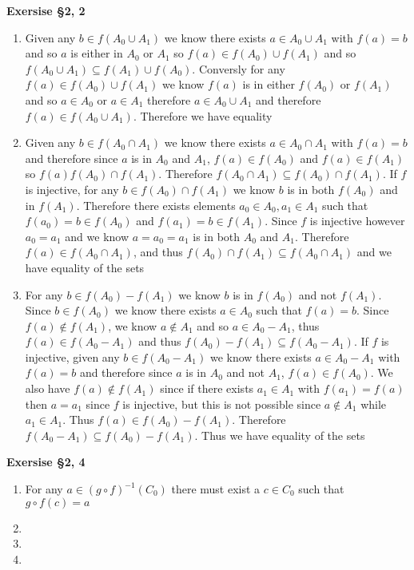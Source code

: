 \documentclass[12pt]{article}
\newenvironment{ques}[1]{\textbf{Exersise #1}\vspace{1 mm}\\ }{\bigskip}
\theoremstyle{definition}
\begin{document}
\begin{ques}{\S 2, 2}
\begin{enumerate}
		\item
			Given any $b \in f(A_0 \cup A_1)$ we know there exists
			$a \in A_0 \cup A_1$ with $f(a) = b$ and so $a$ is
			either in $A_0$ or $A_1$ so $f(a) \in f(A_0) \cup
			f(A_1)$ and so $f(A_0 \cup A_1) \subseteq f(A_1) \cup
			f(A_0)$.  Conversly for any $f(a) \in f(A_0) \cup
			f(A_1)$ we know $f(a)$ is in either $f(A_0)$ or
			$f(A_1)$ and so $a \in A_0$ or $a \in A_1$ therefore $a
			\in A_0 \cup A_1$ and therefore $f(a) \in f(A_0 \cup
			A_1)$. Therefore we have equality
		\item
			Given any $b \in f(A_0 \cap A_1)$ we know there exists
			$a \in A_0 \cap A_1$ with $f(a) = b$ and therefore
			since $a$ is in $A_0$ and $A_1$, $f(a) \in f(A_0)$ and
			$f(a) \in f(A_1)$ so $f(a) f(A_0) \cap f(A_1)$.
			Therefore $f(A_0 \cap A_1) \subseteq f(A_0) \cap
			f(A_1)$. If $f$ is injective, for any $b \in f(A_0)
			\cap f(A_1)$ we know $b$ is in both $f(A_0)$ and in
			$f(A_1)$. Therefore there exists elements $a_0 \in A_0,
			a_1 \in A_1$ such that $f(a_0) = b \in f(A_0)$ and
			$f(a_1) = b \in f(A_1)$. Since $f$ is injective however
			$a_0 = a_1$ and we know $a = a_0 = a_1$ is in both
			$A_0$ and $A_1$. Therefore $f(a) \in f(A_0 \cap A_1)$,
			and thus $f(A_0) \cap f(A_1) \subseteq f(A_0 \cap A_1)$
			and we have equality of the sets

		\item
			 For any $b \in f(A_0) - f(A_1)$ we know $b$ is in
			 $f(A_0)$ and not $f(A_1)$. Since $b \in f(A_0)$ we
			 know there exists $a \in A_0$ such that $f(a) = b$.
			 Since $f(a) \notin f(A_1)$, we know $a \notin A_1$ and
			 so $a \in A_0 - A_1$, thus $f(a) \in f(A_0 - A_1)$ and
			 thus $f(A_0) - f(A_1) \subseteq f(A_0 - A_1)$. If $f$
			 is injective, given any $b \in f(A_0 - A_1)$ we know
			 there exists $a \in A_0 - A_1$ with $f(a) = b$ and
			 therefore since $a$ is in $A_0$ and not $A_1$, $f(a)
			 \in f(A_0)$. We also have $f(a) \notin f(A_1)$ since
			 if there exists $a_1 \in A_1$ with $f(a_1) = f(a)$
			 then $a = a_1$ since $f$ is injective, but this is not
			 possible since $a \notin A_1$ while $a_1 \in A_1$.
			 Thus $f(a) \in f(A_0) - f(A_1)$.  Therefore $f(A_0 -
			 A_1) \subseteq f(A_0) - f(A_1)$. Thus we have equality
			 of the sets

	\end{enumerate}
\end{ques}

\begin{ques}{\S 2, 4}
	\begin{enumerate}
		\item
			For any $a \in (g \circ f)^{-1}(C_0)$ there must exist a $c \in C_0$ such that $g \circ f (c) = a$

		\item

		\item

		\item

	\end{enumerate}
\end{ques}
\end{document}
